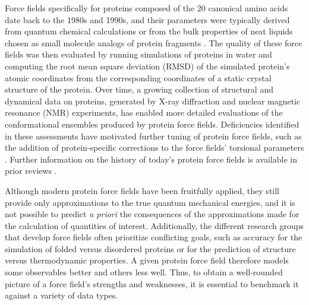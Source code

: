 \documentclass[9pt,review]{livecoms}
\begin{document}
Force fields specifically for proteins composed of the 20 canonical amino acids date back to the 1980s and 1990s, and their parameters were typically derived from quantum chemical calculations or from the bulk properties of neat liquids chosen as small molecule analogs of protein fragments \cite{jorgensen_opls_1988,cornell_second_1995,mackerell_all-atom_1998}.
The quality of these force fields was then evaluated by running simulations of proteins in water and computing the root mean square deviation (RMSD) of the simulated protein’s atomic coordinates from the corresponding coordinates of a static crystal structure of the protein.
Over time, a growing collection of structural and dynamical data on proteins, generated by X-ray diffraction and nuclear magnetic resonance (NMR) experiments, has enabled more detailed evaluations of the conformational ensembles produced by protein force fields.
Deficiencies identified in these assessments have motivated further tuning of protein force fields, such as the addition of protein-specific corrections to the force fields’ torsional parameters \cite{lindorff-larsen_improved_2010,best_optimization_2012,mackerell_jr_extending_2004,Hornak:2006:Proteins,Maier:2015:J.Chem.TheoryComput.,diem_hamiltonian_2020,tian_ff19sb_2020}.
Further information on the history of today’s protein force fields is available in prior reviews \cite{lifson_recent_1973,ponder_force_2003,guvench_comparison_2008,zhu_recent_2012,dauber-osguthorpe_biomolecular_2019}.

Although modern protein force fields have been fruitfully applied, they still provide only approximations to the true quantum mechanical energies, and it is not possible to predict {\em a priori} the consequences of the approximations made for the calculation of quantities of interest. 
Additionally, the different research groups that develop force fields often prioritize conflicting goals, such as accuracy for the simulation of folded versus disordered proteins or for the prediction of structure versus thermodynamic properties.
A given protein force field therefore models some observables better and others less well.
Thus, to obtain a well-rounded picture of a force field’s strengths and weaknesses, it is essential to benchmark it against a variety of data types. 
\end{document}

